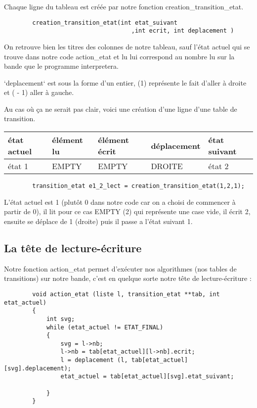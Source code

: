 \documentclass[a4paper,10pt, parskip=true]{scrartcl}
\begin{document}
        
        Chaque ligne du tableau est créée par notre fonction creation\_transition\_etat. 
        
        \begin{verbatim}
        creation_transition_etat(int etat_suivant 
                                    ,int ecrit, int deplacement )
        \end{verbatim}
        
        On retrouve bien les titres des colonnes de notre tableau, sauf l'état actuel qui se trouve dans notre code action\_etat et lu lui correspond au nombre lu sur la bande que le programme interpretera.
        
        `deplacement` est sous la forme d'un entier, (1) représente le fait d'aller à droite et ( - 1) aller à gauche.
        
        Au cas où ça ne serait pas clair, voici une création d'une ligne d'une table de transition.
        
        
        \begin{tabular}{|l|l|l|l|l|}
          \hline
          état actuel & élément lu & élément  écrit & déplacement & état suivant\\
          \hline
          état 1 & EMPTY & EMPTY & DROITE & état 2  \\
          \hline
        \end{tabular}
        
        \begin{verbatim}
        transition_etat e1_2_lect = creation_transition_etat(1,2,1);
        \end{verbatim}
        
        L’état actuel est 1 (plutôt 0 dans notre code car on a choisi de commencer à partir de 0), il lit pour ce cas EMPTY (2) qui représente une case vide, il écrit 2, ensuite se déplace de 1 (droite) puis il passe a l’état suivant 1. 
        

    \subsection{La tête de lecture-écriture}
        Notre fonction action\_etat permet d'exécuter nos algorithmes (nos tables de transitions) sur notre bande, c'est en quelque sorte notre tête de lecture-écriture : 
        
        \begin{verbatim}
        void action_etat (liste l, transition_etat **tab, int etat_actuel)
        {
            int svg;
            while (etat_actuel != ETAT_FINAL)
            {
            	svg = l->nb;
	            l->nb = tab[etat_actuel][l->nb].ecrit;
                l = deplacement (l, tab[etat_actuel][svg].deplacement);
	            etat_actuel = tab[etat_actuel][svg].etat_suivant;

            }
        }
        \end{verbatim}
        
\end{document}
